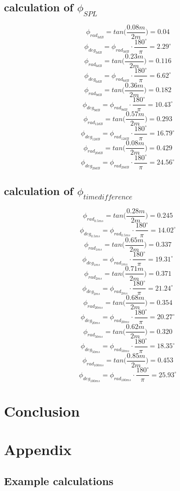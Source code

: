 \documentclass{article}
\begin{document}
\subsection{calculation of $\phi_{SPL}$}
$$\phi_{rad_{3dB}}=tan\bigg(\frac{0.08m}{2m}\bigg)=0.04$$
$$\phi_{deg_{3dB}}=\phi_{rad_{3dB}}\cdot\frac{180^\circ}{\pi}=2.29^\circ$$
$$\phi_{rad_{6dB}}=tan\bigg(\frac{0.23m}{2m}\bigg)=0.116$$
$$\phi_{deg_{6dB}}=\phi_{rad_{6dB}}\cdot\frac{180^\circ}{\pi}=6.62^\circ$$
$$\phi_{rad_{9dB}}=tan\bigg(\frac{0.36m}{2m}\bigg)=0.182$$
$$\phi_{deg_{9dB}}=\phi_{rad_{9dB}}\cdot\frac{180^\circ}{\pi}=10.43^\circ$$
$$\phi_{rad_{12dB}}=tan\bigg(\frac{0.57m}{2m}\bigg)=0.293$$
$$\phi_{deg_{12dB}}=\phi_{rad_{12dB}}\cdot\frac{180^\circ}{\pi}=16.79^\circ$$
$$\phi_{rad_{20dB}}=tan\bigg(\frac{0.08m}{2m}\bigg)=0.429$$
$$\phi_{deg_{20dB}}=\phi_{rad_{20dB}}\cdot\frac{180^\circ}{\pi}=24.56^\circ$$


\subsection{calculation of $\phi_{timedifference}$}
$$\phi_{rad_{0.5ms}}=tan\bigg(\frac{0.28m}{2m}\bigg)=0.245$$
$$\phi_{deg_{0.5ms}}=\phi_{rad_{0.5ms}}\cdot\frac{180^\circ}{\pi}=14.02^\circ$$
$$\phi_{rad_{1ms}}=tan\bigg(\frac{0.65m}{2m}\bigg)=0.337$$
$$\phi_{deg_{1ms}}=\phi_{rad_{1ms}}\cdot\frac{180^\circ}{\pi}=19.31^\circ$$
$$\phi_{rad_{2ms}}=tan\bigg(\frac{0.71m}{2m}\bigg)=0.371$$
$$\phi_{deg_{2ms}}=\phi_{rad_{2ms}}\cdot\frac{180^\circ}{\pi}=21.24^\circ$$
$$\phi_{rad_{20ms}}=tan\bigg(\frac{0.68m}{2m}\bigg)=0.354$$
$$\phi_{deg_{20ms}}=\phi_{rad_{20ms}}\cdot\frac{180^\circ}{\pi}=20.27^\circ$$
$$\phi_{rad_{50ms}}=tan\bigg(\frac{0.62m}{2m}\bigg)=0.320$$
$$\phi_{deg_{50ms}}=\phi_{rad_{50ms}}\cdot\frac{180^\circ}{\pi}=18.35^\circ$$
$$\phi_{rad_{100ms}}=tan\bigg(\frac{0.85m}{2m}\bigg)=0.453$$
$$\phi_{deg_{100ms}}=\phi_{rad_{100ms}}\cdot\frac{180^\circ}{\pi}=25.93^\circ$$

\newpage
\section{Conclusion}
\newpage
\section{Appendix}
\subsection{Example calculations}
\end{document}
